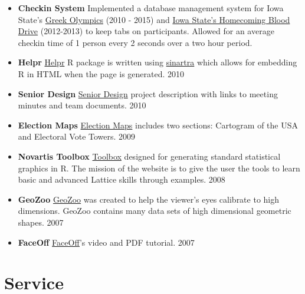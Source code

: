 \documentclass[oneside]{article}
\begin{document}
\begin{itemize}

  \item{\bf Checkin System} Implemented a database management system for Iowa State's \href{http://www.greekweek.barretschloerke.com/}{Greek Olympics} (2010 - 2015) and \href{http://www.homecoming.barretschloerke.com/}{Iowa State's Homecoming Blood Drive} (2012-2013) to keep tabs on participants.  Allowed for an average checkin time of 1 person every 2 seconds over a two hour period.

  \item{\bf Helpr} \href{http://github.com/hadley/helpr}{Helpr} {R} package is written using \href{http://github.com/hadley/sinartra}{sinartra} which allows for embedding R in HTML when the page is generated. 2010

  \item{\bf Senior Design}
  \href{http://seniord.ece.iastate.edu/dec1009/}{Senior Design} project description with links to meeting minutes and team documents. 2010

  \item{\bf Election Maps} \href{http://barretschloerke.com/Election/index.html}{Election Maps} includes two sections: Cartogram of the USA and Electoral Vote Towers. 2009

  \item{\bf Novartis Toolbox} \href{http://barretschloerke.com/Novartis/}{Toolbox} designed for generating standard statistical graphics in R. The mission of the website is to give the user the tools to learn basic and advanced Lattice skills through examples. 2008

  \item{\bf GeoZoo} \href{http://streaming.stat.iastate.edu/~dicook/geometric-data/}{GeoZoo} was created to help the viewer's eyes calibrate to high dimensions. GeoZoo contains many data sets of high dimensional geometric shapes. 2007

  \item{\bf FaceOff} \href{http://www.public.iastate.edu/~bigbear/FaceOff/index.html}{FaceOff}'s video and PDF tutorial. 2007

\end{itemize}





\section{Service}
\end{document}
